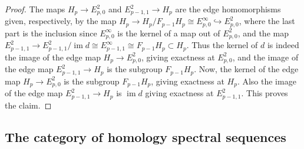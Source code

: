 \documentclass[reqno]{amsart}
\theoremstyle{definition}
\theoremstyle{remark}
\DeclareMathOperator{\im}{im}
\begin{document}
    \begin{proof}
        The maps
        $H_p \to E_{p,0}^2$ and
        $E_{p-1,1}^2 \to H_p$ are the edge homomorphisms given,
        respectively, by the map
        $H_p \to H_p / F_{p-1}H_p \cong E_{p,0}^{\infty}
        \hookrightarrow E_{p,0}^2$, where the last
        part is the inclusion since
        $E_{p,0}^{\infty}$ is the kernel of a map
        out of $E_{p,0}^2$, and
        the map
        $E_{p-1,1}^2 \to 
        E_{p-1,1}^2 / \im d \cong
        E_{p-1,1}^{\infty} \cong F_{p-1}H_p
        \subset H_p$. Thus the kernel of $d$ is
        indeed the image of the edge map
        $H_p \to E_{p,0}^2$, giving exactness
        at $E_{p,0}^2$, and the
        image of the edge map
        $E_{p-1,1}^2 \to H_p$ is the subgroup
        $F_{p-1}H_p$. Now, the kernel
        of the edge map
        $H_p \to E_{p,0}^2$ is
        the subgroup $F_{p-1}H_p$, giving
        exactness at $H_p$.
        Also the image of the edge
        map $E_{p-1,1}^2 \to H_p$ is
        $\im d$ giving exactness at
        $E_{p-1,1}^2$. This proves the claim.
    \end{proof}


    \subsection{The category of homology spectral
    sequences}
\end{document}
